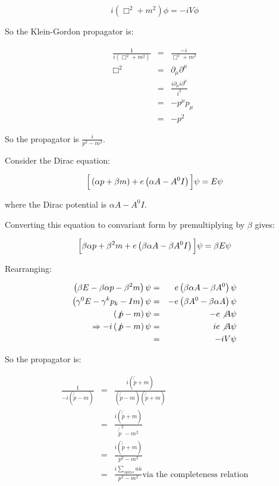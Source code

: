 \[
  i\left(\Box^2 + m^2\right)\phi = -iV\phi
\]

So the Klein-Gordon propagator is:

\begin{eqnarray*}
  \frac{1}{i\left(\Box^2 + m^2\right)} & = & \frac{-i}{\Box^2 + m^2} \\
  \Box^2 & = & \partial_{\mu}\partial^{\mu} \\
  & = & \frac{i\partial_{\mu}i\partial^{\mu}}{i^2} \\
  & = & -p^{\mu}p_{\mu} \\
  & = & -p^2
\end{eqnarray*}

So the propagator is $\displaystyle\frac{i}{p^2 - m^2}$.

Consider the Dirac equation:

\[
  \Big[\left(\alpha p + \beta m\right) + e\left(\alpha A - A^0I\right)\Big] \psi = E\psi
\]

where the Dirac potential is $\alpha A - A^0I$.

Converting this equation to convariant form by premultiplying by $\beta$ gives:

\[
  \Big[\beta\alpha p + \beta^2m + e\left(\beta\alpha A - \beta A^0I\right)\Big]\psi = \beta E\psi
\]

Rearranging:

\begin{eqnarray*}
  \left(\beta E - \beta \alpha p - \beta^2 m\right)\psi & = & e\left( \beta\alpha A - \beta A^0\right)\psi \\
  \left(\gamma^0 E - \gamma^kp_k -Im\right)\psi & = & -e\left(\beta A^0 - \beta\alpha A\right)\psi \\
  \left(\not{p} - m \right)\psi & = & -e\not{A}\psi \\
  \Rightarrow -i\left(\not{p} - m\right)\psi & = & ie\not{A}\psi \\
  & = & -iV\psi
\end{eqnarray*}

So the propagator is:

\begin{eqnarray*}
  \frac{1}{-i\left(\not{p} - m\right)} & = & \frac{i\left(\not{p} + m\right)}{\left(\not{p}-m\right)\left(\not{p} + m\right)} \\
  & = & \frac{i\left(\not{p} + m\right)}{\not{p}^2 - m^2} \\
  & = & \frac{i\left(\not{p} + m\right)}{p^2 - m^2} \\
  & = & \frac{i\sum_{spins}u\bar{u}}{p^2 - m^2} \textrm{via the completeness relation}
\end{eqnarray*}

